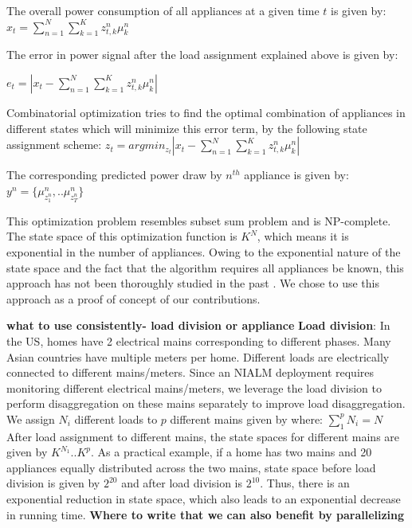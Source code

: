 \documentclass[conference]{IEEEtran}
\begin{document}
The overall power consumption of all appliances at a given time $t$ is given by:
$\hat{x}_{t}=\sum\limits_{n=1}^{N}\sum\limits_{k=1}^{K} z_{t,k}^n \mu_k^n$

The error in power signal after the load assignment explained above is given by:

$e_t=|x_t-\sum\limits_{n=1}^{N}\sum\limits_{k=1}^{K}z_{t,k}^n\mu_k^n|$

Combinatorial optimization tries to find the optimal combination of appliances in different states which will minimize this error term, by the following state assignment scheme:
$z_t=arg min_{z_t}|x_t-\sum\limits_{n=1}^{N}\sum\limits_{k=1}^{K}z_{t,k}^n\mu_k^n|$

The corresponding predicted power draw by $n^{th}$ appliance is given by:
$y^n=\{\mu_{z_1^n}^n,..\mu_{z_T^n}^n \}$

This optimization problem resembles subset sum problem \cite{knapsack} and is NP-complete. The state space of this optimization function is $K^N$, which means it is exponential in the number of appliances. Owing to the exponential nature of the state space and the fact that the algorithm requires all appliances be known, this approach has not been thoroughly studied in the past \cite{parson2012_aaai}. We chose to use this approach as a proof of concept of our contributions.

\textbf{what to use consistently- load division or appliance}
\textbf{Load division}: In the US, homes have 2 electrical mains corresponding to different phases. Many Asian countries have multiple meters per home. Different loads are electrically connected to different mains/meters. Since an NIALM deployment requires monitoring different electrical mains/meters, we leverage the load division to perform disaggregation on these mains separately to improve load disaggregation. We assign $N_i$ different loads to $p$ different mains given by where: $\sum\limits_{1}^{p}{N_i}=N$
After load assignment to different mains, the state spaces for different mains are given by $K^{N_1}..K^{p}$. As a practical example, if a home has two mains and 20 appliances equally distributed across the two mains, state space before load division is given by $2^{20}$ and after load division is $2^{10}$. Thus, there is an exponential reduction in state space, which also leads to an exponential decrease in running time.
\textbf{Where to write that we can also benefit by parallelizing} 
\end{document}
